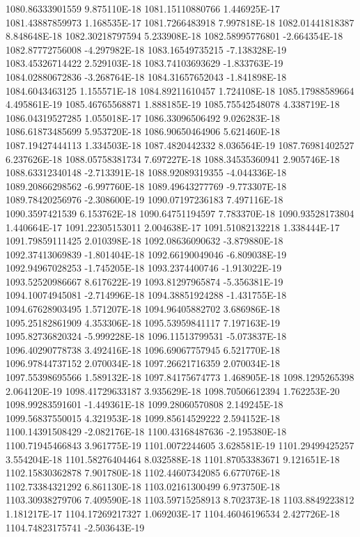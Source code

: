 1080.86333901559  9.875110E-18
1081.15110880766  1.446925E-17
1081.43887859973  1.168535E-17
1081.7266483918  7.997818E-18
1082.01441818387  8.848648E-18
1082.30218797594  5.233908E-18
1082.58995776801  -2.664354E-18
1082.87772756008  -4.297982E-18
1083.16549735215  -7.138328E-19
1083.45326714422  2.529103E-18
1083.74103693629  -1.833763E-19
1084.02880672836  -3.268764E-18
1084.31657652043  -1.841898E-18
1084.6043463125  1.155571E-18
1084.89211610457  1.724108E-18
1085.17988589664  4.495861E-19
1085.46765568871  1.888185E-19
1085.75542548078  4.338719E-18
1086.04319527285  1.055018E-17
1086.33096506492  9.026283E-18
1086.61873485699  5.953720E-18
1086.90650464906  5.621460E-18
1087.19427444113  1.334503E-18
1087.4820442332  8.036564E-19
1087.76981402527  6.237626E-18
1088.05758381734  7.697227E-18
1088.34535360941  2.905746E-18
1088.63312340148  -2.713391E-18
1088.92089319355  -4.044336E-18
1089.20866298562  -6.997760E-18
1089.49643277769  -9.773307E-18
1089.78420256976  -2.308600E-19
1090.07197236183  7.497116E-18
1090.3597421539  6.153762E-18
1090.64751194597  7.783370E-18
1090.93528173804  1.440664E-17
1091.22305153011  2.004638E-17
1091.51082132218  1.338444E-17
1091.79859111425  2.010398E-18
1092.08636090632  -3.879880E-18
1092.37413069839  -1.801404E-18
1092.66190049046  -6.809038E-19
1092.94967028253  -1.745205E-18
1093.2374400746  -1.913022E-19
1093.52520986667  8.617622E-19
1093.81297965874  -5.356381E-19
1094.10074945081  -2.714996E-18
1094.38851924288  -1.431755E-18
1094.67628903495  1.571207E-18
1094.96405882702  3.686986E-18
1095.25182861909  4.353306E-18
1095.53959841117  7.197163E-19
1095.82736820324  -5.999228E-18
1096.11513799531  -5.073837E-18
1096.40290778738  3.492416E-18
1096.69067757945  6.521770E-18
1096.97844737152  2.070034E-18
1097.26621716359  2.070034E-18
1097.55398695566  1.589132E-18
1097.84175674773  1.468905E-18
1098.1295265398  2.064120E-19
1098.41729633187  3.935629E-18
1098.70506612394  1.762253E-20
1098.99283591601  -1.449361E-18
1099.28060570808  2.149245E-18
1099.56837550015  4.321953E-18
1099.85614529222  2.594152E-18
1100.14391508429  -2.082176E-18
1100.43168487636  -2.195380E-18
1100.71945466843  3.961775E-19
1101.0072244605  3.628581E-19
1101.29499425257  3.554204E-18
1101.58276404464  8.032588E-18
1101.87053383671  9.121651E-18
1102.15830362878  7.901780E-18
1102.44607342085  6.677076E-18
1102.73384321292  6.861130E-18
1103.02161300499  6.973750E-18
1103.30938279706  7.409590E-18
1103.59715258913  8.702373E-18
1103.8849223812  1.181217E-17
1104.17269217327  1.069203E-17
1104.46046196534  2.427726E-18
1104.74823175741  -2.503643E-19
